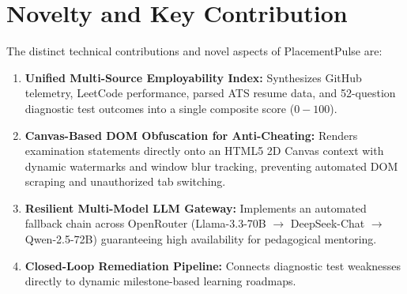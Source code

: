 \section{Novelty and Key Contribution}
The distinct technical contributions and novel aspects of PlacementPulse are:
\begin{enumerate}
    \item \textbf{Unified Multi-Source Employability Index:} Synthesizes GitHub telemetry, LeetCode performance, parsed ATS resume data, and 52-question diagnostic test outcomes into a single composite score ($0-100$).
    \item \textbf{Canvas-Based DOM Obfuscation for Anti-Cheating:} Renders examination statements directly onto an HTML5 2D Canvas context with dynamic watermarks and window blur tracking, preventing automated DOM scraping and unauthorized tab switching.
    \item \textbf{Resilient Multi-Model LLM Gateway:} Implements an automated fallback chain across OpenRouter (Llama-3.3-70B $\rightarrow$ DeepSeek-Chat $\rightarrow$ Qwen-2.5-72B) guaranteeing high availability for pedagogical mentoring.
    \item \textbf{Closed-Loop Remediation Pipeline:} Connects diagnostic test weaknesses directly to dynamic milestone-based learning roadmaps.
\end{enumerate}
